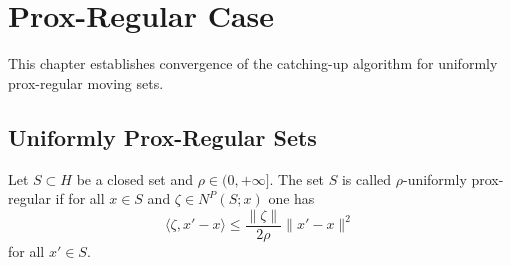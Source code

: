 \chapter{Prox-Regular Case}

This chapter establishes convergence of the catching-up algorithm for uniformly prox-regular moving sets.

\section{Uniformly Prox-Regular Sets}

\begin{definition}
\label{def:prox_regular}
\leanok
Let $S \subset H$ be a closed set and $\rho \in (0, +\infty]$. The set $S$ is called $\rho$-uniformly prox-regular if for all $x \in S$ and $\zeta \in N^P(S; x)$ one has
$$\langle \zeta, x' - x \rangle \le \frac{\|\zeta\|}{2\rho} \|x' - x\|^2$$
for all $x' \in S$.
\end{definition}

